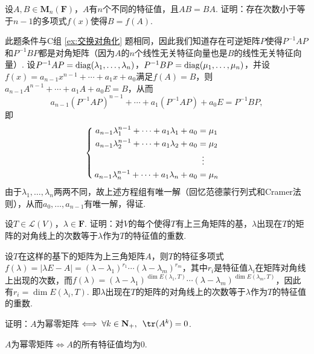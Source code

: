 \begin{exercise}
\begin{exgroup}
        \item 设$A,B\in \mathbf{M}_n(\mathbf{F})$，$A$有$n$个不同的特征值，且$AB=BA$. 证明：存在次数小于等于$n-1$的多项式$f(x)$使得$B=f(A)$.
        \begin{answer}
            此题条件与C组 \ref*{ex:交换对角化} 题相同，因此我们知道存在可逆矩阵$P$使得$P^{-1}AP$和$P^{-1}BP$都是对角矩阵（因为$A$的$n$个线性无关特征向量也是$B$的线性无关特征向量）. 设$P^{-1}AP=\operatorname{diag}(\lambda_1,\ldots,\lambda_n)$，$P^{-1}BP=\operatorname{diag}(\mu_1,\ldots,\mu_n)$，并设$f(x)=a_{n-1}x^{n-1}+\cdots+a_1x+a_0$满足$f(A)=B$，则$a_{n-1}A^{n-1}+\cdots+a_1A+a_0E=B$，从而
          \[a_{n-1}(P^{-1}AP)^{n-1}+\cdots+a_1(P^{-1}AP)+a_0E=P^{-1}BP,\]
          即
          \[\begin{cases} \begin{aligned}
                      a_{n-1}\lambda_1^{n-1}+\cdots+a_1\lambda_1+a_0 & = \mu_1           \\
                      a_{n-1}\lambda_2^{n-1}+\cdots+a_1\lambda_2+a_0 & = \mu_2           \\
                                                                     & \vdotswithin{ = } \\
                      a_{n-1}\lambda_n^{n-1}+\cdots+a_1\lambda_n+a_0 & = \mu_n
                  \end{aligned} \end{cases}\]
          由于$\lambda_1,\ldots,\lambda_n$两两不同，故上述方程组有唯一解（回忆范德蒙行列式和Cramer法则），从而$a_0,\ldots,a_{n-1}$有唯一解，得证.
        \end{answer}

        \item 设$T\in \mathcal{L}(V)$，$\lambda\in\mathbf{F}$. 证明：对$V$的每个使得$T$有上三角矩阵的基，$\lambda$出现在$T$的矩阵的对角线上的次数等于$\lambda$作为$T$的特征值的重数.
        \begin{answer}
            设$T$在这样的基下的矩阵为上三角矩阵$A$，则$T$的特征多项式$f(\lambda)=|\lambda E-A|=(\lambda-\lambda_1)^{r_1}\cdots(\lambda-\lambda_m)^{r_m}$，其中$r_i$是特征值$\lambda_i$在矩阵对角线上出现的次数，而$f(\lambda)=(\lambda-\lambda_1)^{\dim E(\lambda_1,T)}\cdots(\lambda-\lambda_m)^{\dim E(\lambda_m,T)}$，因此有$r_i=\dim E(\lambda_i,T)$.
            即$\lambda$出现在$T$的矩阵的对角线上的次数等于$\lambda$作为$T$的特征值的重数.
        \end{answer}

        \item 证明：$A$为幂零矩阵$\iff \forall k \in \mathbf{N}_+,\enspace\tr(A^k)=0$.
        \begin{answer}
            $A$为幂零矩阵$\iff A$的所有特征值均为0.


\end{answer}
\end{exgroup}
\end{exercise}
